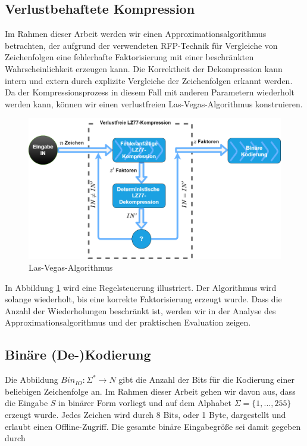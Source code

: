 \subsection{Verlustbehaftete Kompression}
Im Rahmen dieser Arbeit werden wir einen Approximationsalgorithmus betrachten, der aufgrund der verwendeten RFP-Technik für Vergleiche von Zeichenfolgen eine fehlerhafte Faktorisierung mit 
einer beschränkten Wahrscheinlichkeit erzeugen kann. Die Korrektheit der Dekompression kann intern und extern durch explizite Vergleiche der Zeichenfolgen erkannt werden. Da der
Kompressionsprozess in diesem Fall mit anderen Parametern wiederholt werden kann, können wir einen verlustfreien Las-Vegas-Algorithmus konstruieren.

\begin{figure}
    \centering
    \caption{Las-Vegas-Algorithmus}
    \label{fig:lasvegas}
    \includegraphics[scale=0.25]{Images/lasvegas_algorithm.png}
\end{figure}

In Abbildung \ref{fig:lasvegas} wird eine Regelsteuerung illustriert. Der Algorithmus wird solange wiederholt, bis eine korrekte Faktorisierung erzeugt wurde. Dass die
Anzahl der Wiederholungen beschränkt ist, werden wir in der Analyse des Approximationsalgorithmus und der praktischen Evaluation zeigen.

\subsection{Binäre (De-)Kodierung}
Die Abbildung $Bin_{IO}: \Sigma^* \rightarrow N$ gibt die Anzahl der Bits für die Kodierung einer beliebigen Zeichenfolge an. Im Rahmen dieser Arbeit gehen wir davon aus, dass die 
Eingabe $S$ in binärer Form vorliegt und auf dem Alphabet $\Sigma=\{1,...,255\}$ erzeugt wurde. Jedes Zeichen wird durch 8 Bits, oder 1 Byte, dargestellt und erlaubt einen 
Offline-Zugriff. Die gesamte binäre Eingabegröße sei damit gegeben durch 

